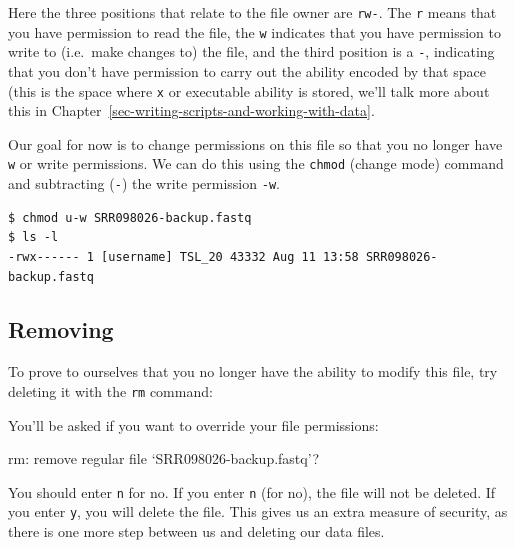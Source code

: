 \documentclass[
  letterpaper,
  DIV=11,
  numbers=noendperiod]{scrreprt}
\makeatletter
\newenvironment{Shaded}{\begin{snugshade}}{\end{snugshade}}
\newcommand{\ExtensionTok}[1]{\textcolor[rgb]{0.00,0.23,0.31}{#1}}
\newcommand{\NormalTok}[1]{\textcolor[rgb]{0.00,0.23,0.31}{#1}}
\newcommand{\PreprocessorTok}[1]{\textcolor[rgb]{0.68,0.00,0.00}{#1}}
\newcommand*\pandocbounded[1]{%
  \sbox\pandoc@box{#1}%
  \Gscale@div\@tempa{\textheight}{\dimexpr\ht\pandoc@box+\dp\pandoc@box\relax}%
  \Gscale@div\@tempb{\linewidth}{\wd\pandoc@box}%
  \ifdim\@tempb\p@<\@tempa\p@\let\@tempa\@tempb\fi%
  \ifdim\@tempa\p@<\p@\scalebox{\@tempa}{\usebox\pandoc@box}%
  \else\usebox{\pandoc@box}%
  \fi%
}
\makeatother
\begin{document}
\pandocbounded{}

Here the three positions that relate to the file owner are \texttt{rw-}.
The \texttt{r} means that you have permission to read the file, the
\texttt{w} indicates that you have permission to write to (i.e.~make
changes to) the file, and the third position is a \texttt{-}, indicating
that you don't have permission to carry out the ability encoded by that
space (this is the space where \texttt{x} or executable ability is
stored, we'll talk more about this in
Chapter~\ref{sec-writing-scripts-and-working-with-data}.

Our goal for now is to change permissions on this file so that you no
longer have \texttt{w} or write permissions. We can do this using the
\texttt{chmod} (change mode) command and subtracting (\texttt{-}) the
write permission \texttt{-w}.

\begin{verbatim}
$ chmod u-w SRR098026-backup.fastq
$ ls -l 
-rwx------ 1 [username] TSL_20 43332 Aug 11 13:58 SRR098026-backup.fastq
\end{verbatim}

\subsection{Removing}\label{removing}

To prove to ourselves that you no longer have the ability to modify this
file, try deleting it with the \texttt{rm} command:

\begin{Shaded}
\end{Shaded}

You'll be asked if you want to override your file permissions:

\begin{Shaded}
\begin{Highlighting}[]
\ExtensionTok{rm:}\NormalTok{ remove regular file ‘SRR098026{-}backup.fastq’}\PreprocessorTok{?}
\end{Highlighting}
\end{Shaded}

You should enter \texttt{n} for no. If you enter \texttt{n} (for no),
the file will not be deleted. If you enter \texttt{y}, you will delete
the file. This gives us an extra measure of security, as there is one
more step between us and deleting our data files.
\end{document}
